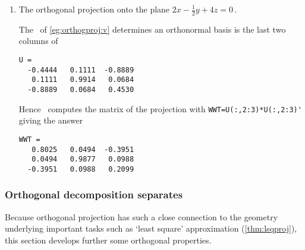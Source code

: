\begin{example}
\begin{enumerate}
\item The orthogonal projection onto the plane \(2x-\frac12y+4z=0\)\,.
\begin{solution} 
The \svd\ of  \autoref{eg:orthogproj:v}  determines an orthonormal basis is the last two columns of
\begin{verbatim}
U =
  -0.4444   0.1111  -0.8889
   0.1111   0.9914   0.0684
  -0.8889   0.0684   0.4530
\end{verbatim}
Hence \script\ computes the matrix of the projection with \verb|WWT=U(:,2:3)*U(:,2:3)'| giving the answer
\setbox\ajrqrbox\hbox{}%
\marginpar{\usebox{\ajrqrbox\\[2ex]}}%
\begin{verbatim}
WWT =
   0.8025   0.0494  -0.3951
   0.0494   0.9877   0.0988
  -0.3951   0.0988   0.2099
\end{verbatim}
\end{solution}
\end{enumerate}
\end{example}










\subsubsection{Orthogonal decomposition separates}

\begin{comment}
\pooliv{p.384} does not seem to define the orthogonal space~\(\WW^\perp\).
\larsvii{p.260--8} has quick development and nice problems---defines orthogonal subspaces but probably confusing for us to do so here as only interested in orthog complement.
\nakos{pp.516--22} has straightforward development.
\end{comment}


Because orthogonal projection has such a close connection to the geometry underlying important tasks such as `least square' approximation (\autoref{thm:lsqproj}), this section develops further some orthogonal properties.

